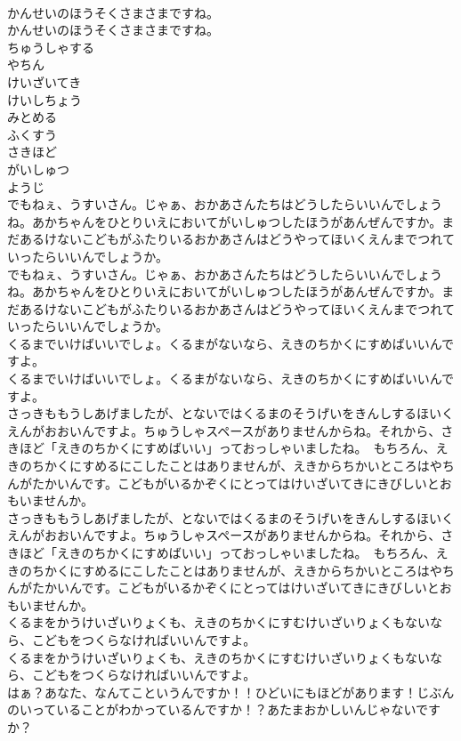 \documentclass[8pt]{extreport}
\begin{document}
\begin{CJK}{UTF8}{min}
\\	かんせいのほうそくさまさまですね。
\\	かんせいのほうそくさまさまですね。
\\	ちゅうしゃする
\\	やちん
\\	けいざいてき
\\	けいしちょう
\\	みとめる
\\	ふくすう
\\	さきほど
\\	がいしゅつ
\\	ようじ
\\	でもねぇ、うすいさん。じゃぁ、おかあさんたちはどうしたらいいんでしょうね。あかちゃんをひとりいえにおいてがいしゅつしたほうがあんぜんですか。まだあるけないこどもがふたりいるおかあさんはどうやってほいくえんまでつれていったらいいんでしょうか。
\\	でもねぇ、うすいさん。じゃぁ、おかあさんたちはどうしたらいいんでしょうね。あかちゃんをひとりいえにおいてがいしゅつしたほうがあんぜんですか。まだあるけないこどもがふたりいるおかあさんはどうやってほいくえんまでつれていったらいいんでしょうか。
\\	くるまでいけばいいでしょ。くるまがないなら、えきのちかくにすめばいいんですよ。
\\	くるまでいけばいいでしょ。くるまがないなら、えきのちかくにすめばいいんですよ。
\\	さっきももうしあげましたが、とないではくるまのそうげいをきんしするほいくえんがおおいんですよ。ちゅうしゃスペースがありませんからね。それから、さきほど「えきのちかくにすめばいい」っておっしゃいましたね。　もちろん、えきのちかくにすめるにこしたことはありませんが、えきからちかいところはやちんがたかいんです。こどもがいるかぞくにとってはけいざいてきにきびしいとおもいませんか。
\\	さっきももうしあげましたが、とないではくるまのそうげいをきんしするほいくえんがおおいんですよ。ちゅうしゃスペースがありませんからね。それから、さきほど「えきのちかくにすめばいい」っておっしゃいましたね。　もちろん、えきのちかくにすめるにこしたことはありませんが、えきからちかいところはやちんがたかいんです。こどもがいるかぞくにとってはけいざいてきにきびしいとおもいませんか。
\\	くるまをかうけいざいりょくも、えきのちかくにすむけいざいりょくもないなら、こどもをつくらなければいいんですよ。
\\	くるまをかうけいざいりょくも、えきのちかくにすむけいざいりょくもないなら、こどもをつくらなければいいんですよ。
\\	はぁ？あなた、なんてこというんですか！！ひどいにもほどがあります！じぶんのいっていることがわかっているんですか！？あたまおかしいんじゃないですか？

\end{CJK}
\end{document}
